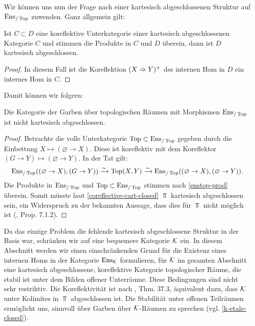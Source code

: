 Wir können uns nun der Frage nach einer kartesisch abgeschlossenen
Struktur auf $\operatorname{Ens}_{/\operatorname{Top}}$ zuwenden. Ganz allgemein gilt:
\begin{prop} \label{coreflective-cart-closed}
  Ist $C \subset D$ eine koreflektive Unterkategorie einer kartesisch
  abgeschlossenen Kategorie $C$ und stimmen die Produkte in $C$ und
  $D$ überein, dann ist $D$ kartesisch abgeschlossen.
\end{prop}
\begin{proof}
  In diesem Fall ist die Koreflektion $(X \Rightarrow Y)^+$ des internen Hom
  in $D$ ein internes Hom in $C$.
\end{proof}

Damit können wir folgern:
\begin{prop} \label{full-enstop-not-cart-closed}
  Die Kategorie der Garben über topologischen Räumen mit Morphismen
  $\operatorname{Ens}_{/\operatorname{Top}}$ ist nicht kartesisch abgeschlossen.
\end{prop}
\begin{proof}
  Betrachte die volle Unterkategorie $\operatorname{Top} \subset \operatorname{Ens}_{/\operatorname{Top}}$ gegeben
  durch die Einbettung $X \mapsto (\varnothing \to X)$. Diese ist
  koreflektiv mit dem Koreflektor $(G \to Y) \mapsto (\varnothing \to
  Y)$. In der Tat gilt:
  \[ \operatorname{Ens}_{/\operatorname{Top}}((\varnothing \to X), (G \to Y)) \xrightarrow[]{\sim} \operatorname{Top}(X, Y)
  \xrightarrow[]{\sim} \operatorname{Ens}_{/\operatorname{Top}}((\varnothing \to X), (\varnothing \to Y)).
  \]
  Die Produkte in $\operatorname{Ens}_{/\operatorname{Top}}$ und $\operatorname{Top} \subset \operatorname{Ens}_{/\operatorname{Top}}$ stimmen nach
  \ref{enstop-prod} überein. Somit müsste laut
  \ref{coreflective-cart-closed} $\Top$ kartesisch abgeschlossen sein,
  ein Widerspruch zu der bekannten Aussage, dass dies für $\Top$ nicht
  möglich ist (\cite{Borceux}, Prop. 7.1.2).
\end{proof}

Da das einzige Problem die fehlende kartesisch abgeschlossene Struktur
in der Basis war, schränken wir auf eine bequemere Kategorie $\mathcal{K}$
ein. In diesem Abschnitt werden wir einen einschränkenden Grund für
die Existenz eines internen Homs in der Kategorie $\operatorname{Ens}_{\mathcal{K}}$
formulieren, für $\mathcal{K}$ im gesamten Abschnitt eine kartesisch
abgeschlossene, koreflektive Kategorie topologischer Räume, die stabil
ist unter dem Bilden offener Unterräume. Diese Bedingungen sind nicht
sehr restriktiv. Die Koreflektivität ist nach \cite{Herrlich},
Thm. 37.3, äquivalent dazu, dass $\mathcal{K}$ unter Kolimites in $\Top$
abgeschlossen ist. Die Stabilität unter offenen Teilräumen ermöglicht
uns, sinnvoll über Garben über $\mathcal{K}$-Räumen zu sprechen
(vgl. \ref{k-etale-closed}).

